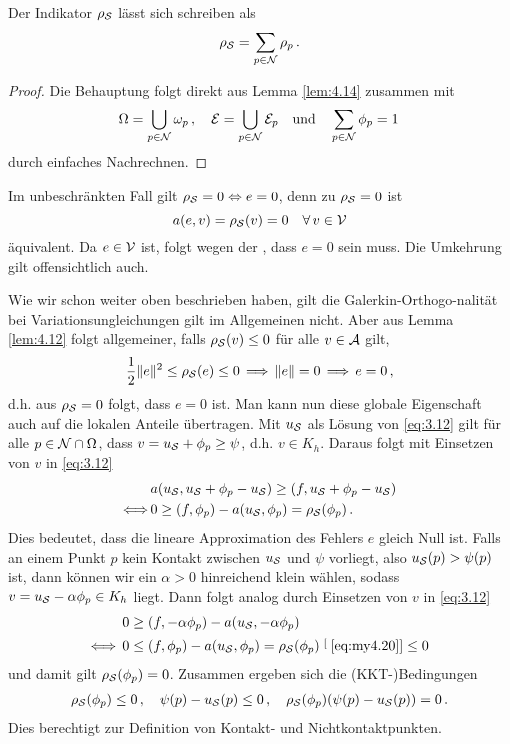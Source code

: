  
\begin{kor}\label{kor:4.15}
Der Indikator $\rho_{\mathcal S}$ lässt sich schreiben als
\begin{align}\label{eq:4.20}
	\rho_{\mathcal S} = \sum_{p \in \mathcal N} \rho_p \, .
\end{align}
\end{kor}

\begin{proof}
Die Behauptung folgt direkt aus Lemma \ref{lem:4.14} zusammen mit
\[
	\Omega = \bigcup_{p\in \mathcal N} \omega_p \, , \quad \mathcal E = \bigcup_{p \in \mathcal N} \mathcal E_p \quad \text{und}\quad \sum_{p \in \mathcal N} \phi_p = 1 \, 
\]
durch einfaches Nachrechnen.
\end{proof}


Im unbeschränkten Fall gilt $\rho_{\mathcal S} = 0 \Leftrightarrow e = 0$, denn zu $\rho_{\mathcal S} = 0$ ist 
\[
	a(e,v) = \rho_{\mathcal S}(v) = 0 \quad \forall \, v \in \mathcal V
\]
äquivalent. Da $e\in \mathcal V$ ist, folgt wegen der , dass $e=0$ sein muss. Die Umkehrung gilt offensichtlich auch.

Wie wir schon weiter oben beschrieben haben, gilt die Galerkin-Orthogo-nalität bei Variationsungleichungen gilt  im Allgemeinen nicht. Aber aus Lemma \ref{lem:4.12} folgt allgemeiner, falls $\rho_{\mathcal S} (v) \le 0$ für alle $v \in \mathcal A$ gilt,
\[
	\frac 12 \lVert e\rVert^2 \le \rho_{\mathcal S}(e) \le 0\,  \Longrightarrow\,  \lVert e\rVert = 0 \, \Longrightarrow\, e = 0 \, ,
\]
d.h. aus $\rho_{\mathcal S} = 0$ folgt, dass $e = 0$ ist. Man kann nun diese globale Eigenschaft auch auf die lokalen Anteile übertragen. Mit $u_{\mathcal S}$ als Lösung von \eqref{eq:3.12} gilt für alle $p \in \mathcal N \cap \Omega$, dass $v = u_{\mathcal S} + \phi_p  \ge \psi$, d.h. $v \in K_h$. Daraus folgt mit Einsetzen von $v$ in  \eqref{eq:3.12}
\begin{align}\notag
	&a(u_{\mathcal S}, u_{\mathcal S} + \phi_p - u_{\mathcal S}) \ge (f,u_{\mathcal S}+\phi_p-u_{\mathcal S}) \\
	\label{eq:my4.20}
	\Longleftrightarrow \,  & 0 \ge (f,\phi_p)-a(u_{\mathcal S},\phi_p) = \rho_{\mathcal S}(\phi_p) \, .
\end{align}
Dies bedeutet, dass die lineare Approximation des Fehlers $e$ gleich Null ist. Falls an einem Punkt $p$ kein Kontakt zwischen $u_{\mathcal S}$ und $\psi$ vorliegt, also $u_{\mathcal S} (p) > \psi(p)$ ist, dann können wir ein $\alpha > 0$ hinreichend klein wählen, sodass $v = u_{\mathcal S} - \alpha \phi_p \in K_h$ liegt. Dann folgt analog durch Einsetzen von $v$ in \eqref{eq:3.12}
\begin{align*}
	0 & \ge (f,-\alpha \phi_p) - a(u_{\mathcal S},-\alpha\phi_p) \\
	\Longleftrightarrow \, 0 & \le (f,\phi_p) - a(u_{\mathcal S},\phi_p) = \rho_{\mathcal S} (\phi_p) \stackrel[\scriptsize\eqref{eq:my4.20}]{}\le 0
\end{align*}
und damit gilt $\rho_{\mathcal S} (\phi_p) = 0$.  Zusammen ergeben sich die (KKT-)Bedingungen
\begin{align}\label{eq:4.21}
	\rho_{\mathcal S} (\phi_p) \le 0 \, , \quad \psi(p)-u_{\mathcal S} (p) \le 0 \, , \quad \rho_{\mathcal S} (\phi_p) (\psi(p)-u_{\mathcal S} (p)) = 0 \, .
\end{align}
Dies berechtigt zur Definition von Kontakt- und Nichtkontaktpunkten.


